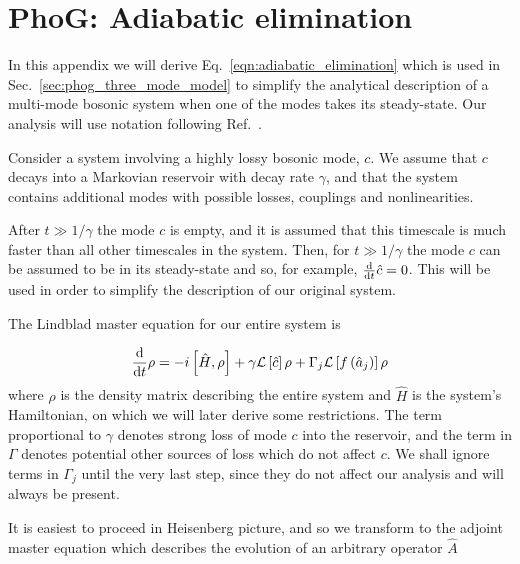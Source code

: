 %
%
%


\chapter{PhoG: Adiabatic elimination}\label{appendix:adiabatic_elimination}

In this appendix we will derive Eq.~\ref{eqn:adiabatic_elimination} which is used in Sec.~\ref{sec:phog_three_mode_model} to simplify the analytical description of a multi-mode bosonic system when one of the modes takes its steady-state. Our analysis will use notation following Ref.~\cite{Shchesnovich2011}. 

Consider a system involving a highly lossy bosonic mode, $c$. We assume that $c$ decays into a Markovian reservoir with decay rate $\gamma$, and that the system contains additional modes with possible losses, couplings and nonlinearities. 

After $t \gg 1/\gamma$ the mode $c$ is empty, and it is assumed that this timescale is much faster than all other timescales in the system. Then, for $t \gg 1/\gamma$ the mode $c$ can be assumed to be in its steady-state and so, for example, $\frac{\mathrm{d}}{\mathrm{d}t} \hat{c} = 0$. This will be used in order to simplify the description of our original system.

The Lindblad master equation for our entire system is

\begin{equation}
\frac{\mathrm{d}}{\mathrm{d}t} \rho = - i \left[ \hat{H}, \rho \right] + \gamma \mathcal{L}\left[\hat{c}\right] \rho + \Gamma_j\mathcal{L}\left[f\left(\hat{a}_j\right)\right] \rho
\end{equation}
where $\rho$ is the density matrix describing the entire system and $\hat{H}$ is the system's Hamiltonian, on which we will later derive some restrictions. The term proportional to  $\gamma$ denotes strong loss of mode $c$ into the reservoir, and the term in $\Gamma$ denotes potential other sources of loss which do not affect $c$. We shall ignore terms in $\Gamma_j$ until the very last step, since they do not affect our analysis and will always be present.

It is easiest to proceed in Heisenberg picture, and so we transform to the adjoint master equation \cite{Breuer2002} which describes the evolution of an arbitrary operator $\hat{A}$

